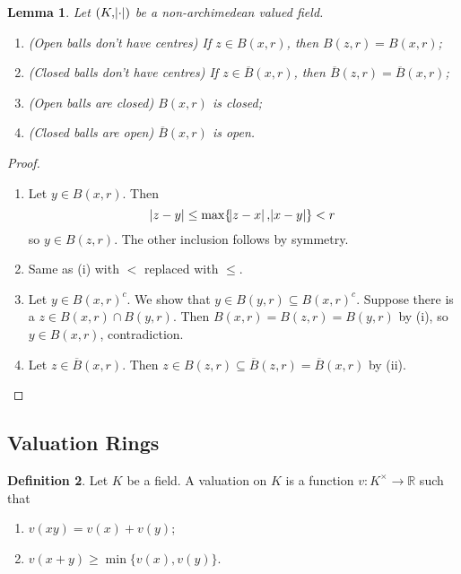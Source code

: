\documentclass[11pt]{article}
\theoremstyle{definition}
\newtheorem{definition}{Definition}[subsection]
\theoremstyle{plain}
\newtheorem{lemma}[definition]{Lemma}
\theoremstyle{remark}
\newcommand{\RR}{\mathbb{R}}
\begin{document}
\begin{lemma}\label{lem:1_8}
    Let $(K, \abs{\cdot})$ be a non-archimedean valued field.
    \begin{enumerate}
        \item (Open balls don't have centres) If $z \in B(x, r)$, then $B(z, r) = B(x, r)$;
        \item (Closed balls don't have centres) If $z \in \overline{B}(x, r)$, then $\overline{B}(z, r) = \overline{B}(x, r)$;
        \item (Open balls are closed) $B(x, r)$ is closed;
        \item (Closed balls are open) $\overline{B}(x, r)$ is open.
    \end{enumerate}
\end{lemma}
\begin{proof}\phantom{}
    \begin{enumerate}
        \item Let $y \in B(x, r)$. Then
            \begin{equation*}
                \abs{z - y} \le \max\{\abs{z-x}, \abs{x-y}\} < r
            \end{equation*}
            so $y \in B(z, r)$. The other inclusion follows by symmetry.
        \item Same as (i) with $<$ replaced with $\le$.
        \item Let $y \in B(x, r)^c$. We show that $y \in B(y, r) \subseteq B(x, r)^c$. Suppose there is a $z \in B(x, r) \cap B(y, r)$. Then $B(x, r) = B(z, r) = B(y, r)$ by (i), so $y \in B(x, r)$, contradiction.
        \item Let $z \in \overline{B}(x, r)$. Then $z \in B(z, r) \subseteq \overline{B}(z, r) = \overline{B}(x, r)$ by (ii). \qedhere
    \end{enumerate}
\end{proof}

\subsection{Valuation Rings}

\begin{definition}\label{def:2_1}
    Let $K$ be a field. A valuation on $K$ is a function $v : K^\times \to \RR$ such that
    \begin{enumerate}
        \item $v(xy) = v(x) + v(y)$;
        \item $v(x + y) \ge \min\{v(x), v(y)\}$.
    \end{enumerate}
\end{definition}
\end{document}
